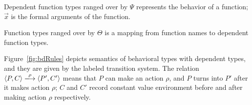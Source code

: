 Dependent function types ranged over by \(\Psi\) represents the
behavior of a function; \(\vec{x}\) is the formal arguments of the
function.

Function types ranged over by \(\Theta\) is a mapping from function names to dependent function types.





Figure~\ref{fig:bdRules} depicts semantics of behavioral types with
dependent types, and they are given by the labeled transition
system. The relation \( \langle P, C \rangle \xlongrightarrow{\rho}
\langle P', C' \rangle \) means that \(P\) can make an action
\(\rho\), and \(P\) turns into \(P'\) after it makes action \(\rho\);
\(C\) and \(C'\) record constant value environment before and after
making action \(\rho\) respectively.

